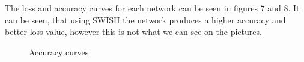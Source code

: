 \documentclass{article}
\begin{document}
The loss and accuracy curves for each network can be seen in figures 7 and 8. It can be seen, that using SWISH the network produces a higher accuracy and better loss value, however this is not what we can see on the pictures.
\begin{figure}[H]%
	\centering
	\qquad
	\qquad
	\qquad
	\caption{Accuracy curves}%
	\label{fig:example}%
\end{figure}
\end{document}

